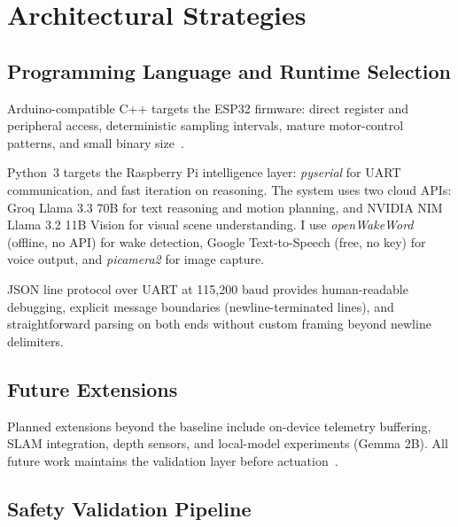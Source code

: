 \section{Architectural Strategies}
\label{sec:arch_strat}

\subsection{Programming Language and Runtime Selection}
\label{subsec:lang}

Arduino-compatible C++ targets the ESP32 firmware: direct register and peripheral access, deterministic sampling intervals, mature motor-control patterns, and small binary size~\cite{espressif2023esp32}.

Python~3 targets the Raspberry Pi intelligence layer: \textit{pyserial} for UART communication, and fast iteration on reasoning. The system uses two cloud APIs: Groq Llama 3.3 70B for text reasoning and motion planning, and NVIDIA NIM Llama 3.2 11B Vision for visual scene understanding. I use \textit{openWakeWord} (offline, no API) for wake detection, Google Text-to-Speech (free, no key) for voice output, and \textit{picamera2} for image capture.


JSON line protocol over UART at 115,200 baud provides human-readable debugging, explicit message boundaries (newline-terminated lines), and straightforward parsing on both ends without custom framing beyond newline delimiters.

\subsection{Future Extensions}
\label{subsec:future}

Planned extensions beyond the baseline include on-device telemetry buffering, SLAM integration, depth sensors, and local-model experiments (Gemma 2B). All future work maintains the validation layer before actuation~\cite{huang2023grounded}.

\subsection{Safety Validation Pipeline}
\label{subsec:safety_pipeline}

